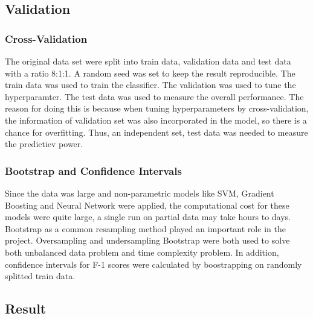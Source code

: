 \documentclass{article}
\begin{document}
\subsection{Validation}
\subsubsection{Cross-Validation}
The original data set were split into train data, validation data and test data with a ratio 8:1:1. A random seed was set to keep the result reproducible.
The train data was used to train the classifier. The validation was used to tune the hyperparamter. The test data was used to measure the overall performance. The reason for doing this is because when tuning hyperparameters by cross-validation, the information of validation set was also incorporated in the model, so there is a chance for overfitting. Thus, an independent set, test data was needed to measure the predictiev power.

\subsubsection{Bootstrap and Confidence Intervals}
Since the data was large and non-parametric models like SVM, Gradient Boosting and Neural Network were applied, the computational cost for these models were quite large, a single run on partial data may take hours to days. Bootstrap as a common resampling method played an important role in the project. Oversampling and undersampling Bootstrap were both used to solve both unbalanced data problem and time complexity problem. In addition, confidence intervals for F-1 scores were calculated by boostrapping on randomly splitted train data.

\subsection{Result}
\end{document}
